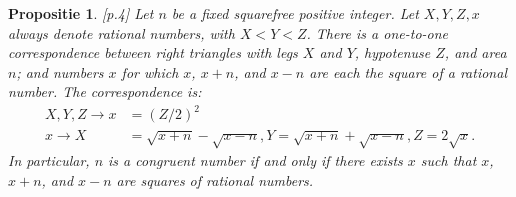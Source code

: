 \documentclass[12pt,reqno]{article}
\begin{document}
	\newtheorem{Prop1}{Propositie}
	\begin{Prop1}
		\cite{Koblitz}[p.4] Let $n$ be a fixed squarefree positive integer. Let $X,Y,Z,x$ always denote rational numbers, with $X<Y<Z$. There is a one-to-one correspondence between right triangles with legs $X$ and $Y$, hypotenuse $Z$, and area $n$; and numbers $x$ for which $x$, $x+n$, and $x-n$ are each the square of a rational number. The correspondence is:
		\begin{align*}
		X,Y,Z\rightarrow x &= (Z/2)^2 \\
		x\rightarrow X &= \sqrt{x+n} - \sqrt{x-n}, Y = \sqrt{x+n}+\sqrt{x-n}, Z = 2\sqrt{x}.
		\end{align*}
		In particular, $n$ is a congruent number if and only if there exists $x$ such that $x$, $x+n$, and $x-n$ are squares of rational numbers.
	\end{Prop1}
	
	
	
	
\end{document}
